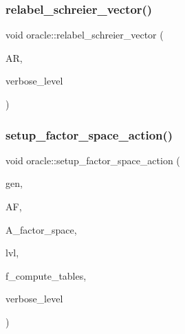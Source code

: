 \mbox{\label{classoracle_ab19d660985a6f027045bd1eb12a388d1}} 
\subsubsection{\texorpdfstring{relabel\+\_\+schreier\+\_\+vector()}{relabel\_schreier\_vector()}}
{\footnotesize\ttfamily void oracle\+::relabel\+\_\+schreier\+\_\+vector (\begin{DoxyParamCaption}\item[{\mbox{\hyperlink{classaction}{action}} \&}]{AR,  }\item[{\mbox{\hyperlink{galois_8h_a09fddde158a3a20bd2dcadb609de11dc}{I\+NT}}}]{verbose\+\_\+level }\end{DoxyParamCaption})}

\mbox{\label{classoracle_a181e076f112ba1f32f5fb4e8abebdb18}} 
\subsubsection{\texorpdfstring{setup\+\_\+factor\+\_\+space\+\_\+action()}{setup\_factor\_space\_action()}}
{\footnotesize\ttfamily void oracle\+::setup\+\_\+factor\+\_\+space\+\_\+action (\begin{DoxyParamCaption}\item[{\mbox{\hyperlink{classgenerator}{generator}} $\ast$}]{gen,  }\item[{\mbox{\hyperlink{classaction__on__factor__space}{action\+\_\+on\+\_\+factor\+\_\+space}} \&}]{AF,  }\item[{\mbox{\hyperlink{classaction}{action}} \&}]{A\+\_\+factor\+\_\+space,  }\item[{\mbox{\hyperlink{galois_8h_a09fddde158a3a20bd2dcadb609de11dc}{I\+NT}}}]{lvl,  }\item[{\mbox{\hyperlink{galois_8h_a09fddde158a3a20bd2dcadb609de11dc}{I\+NT}}}]{f\+\_\+compute\+\_\+tables,  }\item[{\mbox{\hyperlink{galois_8h_a09fddde158a3a20bd2dcadb609de11dc}{I\+NT}}}]{verbose\+\_\+level }\end{DoxyParamCaption})}

